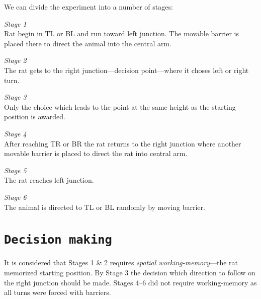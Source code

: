 \documentclass[12pt,a4paper,twocolumn]{article}
\begin{document}
We can divide the experiment into a number of stages:
\begin{description}
\item{\emph{Stage 1}} \hfill\\
Rat begin in TL or BL and run toward left junction. The movable barrier is placed there to direct the animal into the central arm.
\item{\emph{Stage 2}} \hfill\\
The rat gets to the right junction---decision point---where it choses left or right turn.
\item{\emph{Stage 3}} \hfill\\
Only the choice which leads to the point at the same height as the starting position is awarded.
\item{\emph{Stage 4}} \hfill\\
After reaching TR or BR the rat returns to the right junction where another movable barrier is placed to direct the rat into central arm.
\item{\emph{Stage 5}} \hfill\\
The rat reaches left junction.
\item{\emph{Stage 6}} \hfill\\
The animal is directed to TL or BL randomly by moving barrier.
\end{description}


\section*{\texttt{Decision making}}
It is considered that Stages 1 \& 2 requires \emph{spatial working-memory}---the rat memorized starting position. By Stage 3 the decision which direction to follow on the right junction should be made. Stages 4--6 did not require working-memory as all turns were forced with barriers.\\

\end{document}
